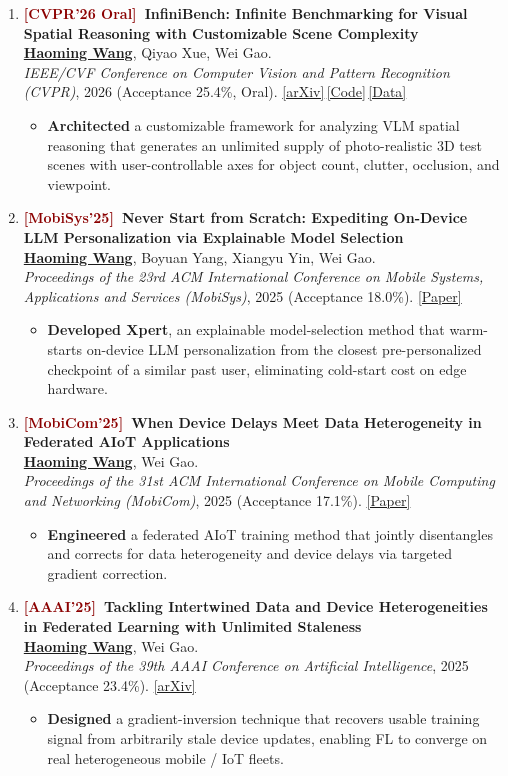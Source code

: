 \documentclass[11pt, letterpaper]{article}
\newenvironment{publist}{
  \begin{enumerate}[leftmargin=1.7em, itemsep=4pt, parsep=0pt, topsep=2pt, label=\arabic*.]
}{\end{enumerate}}
\newcommand{\impactbullet}[1]{%
  \par\vspace{1pt}%
  \begin{itemize}[leftmargin=1.2em, topsep=0pt, itemsep=0pt, parsep=0pt, partopsep=0pt]
    \item #1
  \end{itemize}}
\newcommand{\me}{\underline{\textbf{Haoming Wang}}}
\begin{document}
\begin{publist}
\item \textbf{\textcolor{darkred}{[CVPR'26 Oral]}\ InfiniBench: Infinite Benchmarking for Visual Spatial Reasoning with Customizable Scene Complexity}\\
\me, Qiyao Xue, Wei Gao.\\
\textit{IEEE/CVF Conference on Computer Vision and Pattern Recognition (CVPR)}, 2026 (Acceptance 25.4\%, Oral). \href{https://arxiv.org/abs/2511.18200}{[arXiv]}\,\href{https://github.com/pittisl/infinibench}{[Code]}\,\href{https://huggingface.co/datasets/Haoming645/infinibench}{[Data]}
\impactbullet{\textbf{Architected} a customizable framework for analyzing VLM spatial reasoning that generates an unlimited supply of photo-realistic 3D test scenes with user-controllable axes for object count, clutter, occlusion, and viewpoint.}

\item \textbf{\textcolor{darkred}{[MobiSys'25]}\ Never Start from Scratch: Expediting On-Device LLM Personalization via Explainable Model Selection}\\
\me, Boyuan Yang, Xiangyu Yin, Wei Gao.\\
\textit{Proceedings of the 23rd ACM International Conference on Mobile Systems, Applications and Services (MobiSys)}, 2025 (Acceptance 18.0\%). \href{https://haomingwang645.github.io/pdfs/xpert_paper.pdf}{[Paper]}
\impactbullet{\textbf{Developed Xpert}, an explainable model-selection method that warm-starts on-device LLM personalization from the closest pre-personalized checkpoint of a similar past user, eliminating cold-start cost on edge hardware.}

\item \textbf{\textcolor{darkred}{[MobiCom'25]}\ When Device Delays Meet Data Heterogeneity in Federated AIoT Applications}\\
\me, Wei Gao.\\
\textit{Proceedings of the 31st ACM International Conference on Mobile Computing and Networking (MobiCom)}, 2025 (Acceptance 17.1\%). \href{https://haomingwang645.github.io/pdfs/feddc_paper.pdf}{[Paper]}
\impactbullet{\textbf{Engineered} a federated AIoT training method that jointly disentangles and corrects for data heterogeneity and device delays via targeted gradient correction.}

\item \textbf{\textcolor{darkred}{[AAAI'25]}\ Tackling Intertwined Data and Device Heterogeneities in Federated Learning with Unlimited Staleness}\\
\me, Wei Gao.\\
\textit{Proceedings of the 39th AAAI Conference on Artificial Intelligence}, 2025 (Acceptance 23.4\%). \href{https://arxiv.org/abs/2309.13536}{[arXiv]}
\impactbullet{\textbf{Designed} a gradient-inversion technique that recovers usable training signal from arbitrarily stale device updates, enabling FL to converge on real heterogeneous mobile / IoT fleets.}
\end{publist}
\end{document}
